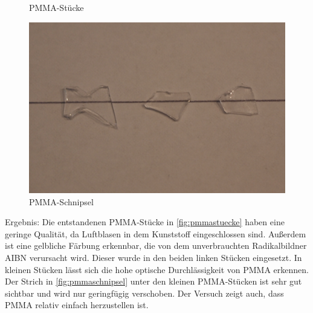 {\begin{figure}[h]
\begin{center}
\begin{minipage}[t]{0.3\textwidth}
\begin{center}
                    \caption[PMMA-Stücke]{PMMA-Stücke}
                    \label{fig:pmmastuecke}
                \end{center}
            \end{minipage}
            \hspace{0.025\textwidth}
            \begin{minipage}[t]{0.3\textwidth}
                \begin{center}
                    \includegraphics[height=0.1\textheight]{Bilder/Optische_Wellenleiter_Die_Polymer_Optische_Faser/Kernmaterialien/pmmaschnipsel.png}
                    \caption[PMMA-Schnipsel]{PMMA-Schnipsel}
                    \label{fig:pmmaschnipsel}
                \end{center}
            \end{minipage}
        \end{center}
    \end{figure}
}{}

Ergebnis: Die entstandenen PMMA-Stücke in \autoref{fig:pmmastuecke} haben eine
geringe Qualität, da Luftblasen in dem Kunststoff eingeschlossen sind. Außerdem
ist eine gelbliche Färbung erkennbar, die von dem unverbrauchten Radikalbildner
AIBN verursacht wird. Dieser wurde in den beiden linken Stücken eingesetzt. In
kleinen Stücken lässt sich die hohe optische Durchlässigkeit von PMMA erkennen.
Der Strich in \autoref{fig:pmmaschnipsel} unter den kleinen PMMA-Stücken ist
sehr gut sichtbar und wird nur geringfügig verschoben. Der Versuch zeigt auch,
dass PMMA relativ einfach herzustellen ist.
